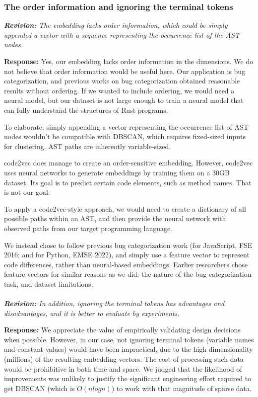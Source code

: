 \documentclass{article}
\begin{document}
\subsubsection{The order information and ignoring the terminal tokens}

\textit{\textbf{Revision:} The embedding lacks order information, which could be simply appended a vector with a sequence representing the occurrence list of the AST nodes.}

\textbf{Response:} Yes, our embedding lacks order information in the dimensions. We do not believe that order information would be useful here. Our application is bug categorization, and previous works on bug categorization obtained reasonable results without ordering. If we wanted to include ordering, we would need a neural model, but our dataset is not large enough to train a neural model that can fully understand the structures of Rust programs. 

To elaborate: simply appending a vector representing the occurrence list of AST nodes wouldn't be compatible with DBSCAN, which requires fixed-sized inputs for clustering. AST paths are inherently variable-sized.

code2vec does manage to create an order-sensitive embedding. However, code2vec uses neural networks to generate embeddings by training them on a 30GB dataset. Its goal is to predict certain code elements, such as method names. That is not our goal.

To apply a code2vec-style approach, we would need to create a dictionary of all possible paths within an AST, and then provide the neural network with observed paths from our target programming language.

We instead chose to follow previous bug categorization work (for JavaScript, FSE 2016; and for Python, EMSE 2022), and simply use a feature vector to represent code differences, rather than neural-based embeddings. Earlier researchers chose feature vectors for similar reasons as we did: the nature of the bug categorization task, and dataset limitations. \\ \\

\textit{\textbf{Revision:} In addition, ignoring the terminal tokens has advantages and disadvantages, and it is better to evaluate by experiments. }

\textbf{Response:} We appreciate the value of empirically validating design decisions when possible. However, in our case, not ignoring terminal tokens (variable names and constant values) would have been impractical, due to the high dimensionality (millions) of the resulting embedding vectors. The cost of processing such data would be prohibitive in both time and space. We judged that the likelihood of improvements was unlikely to justify the significant engineering effort required to get DBSCAN (which is $O(nlogn)$) to work with that magnitude of sparse data.
\end{document}
